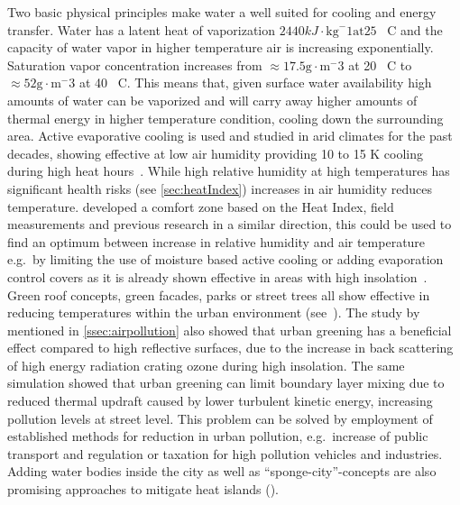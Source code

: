 \documentclass[12pt,a4paper, english,twoside]{scrartcl}
\begin{document}
      Two basic physical principles make water a well suited for cooling and energy transfer.
      Water has a latent heat of vaporization $2440 kJ\cdot \text{kg}^-1 \text{at} 25$ \textdegree\ C and the capacity of water vapor in higher temperature air is increasing exponentially.
      Saturation vapor concentration increases from $\approx17.5 \text{g}\cdot \text{m}^-3$ at 20 \textdegree\ C  to $\approx 52 \text{g}\cdot \text{m}^-3$ at 40 \textdegree\ C.
      This means that, given surface water availability high amounts of water can be vaporized and will carry away higher amounts of thermal energy in higher temperature condition, cooling down the surrounding area. 
      Active evaporative cooling is used and studied in arid climates for the past decades, showing effective at low air humidity providing 10 to 15 K cooling during high heat hours~\autocite{Vanos2022}.
      While high relative humidity at high temperatures has significant health risks (see \cref{sec:heatIndex}) increases in air humidity reduces temperature.
      \Cite{Pontes2022} developed a comfort zone based on the Heat Index, field measurements and previous research in a similar direction, this could be used to find an optimum between increase in relative humidity and air temperature e.g.\ by limiting the use of moisture based active cooling or adding evaporation control covers as it is already shown effective in areas with high insolation~\cite{Ghazvinian2021}.\\
      Green roof concepts, green facades, parks or street trees all show effective in reducing temperatures within the urban environment (see~\cite{Ramamurthy2014, Feyisa2014, Dimoudi2003, Gartland2008}).
      The study by~\cite{Fallmann2016} mentioned in \cref{ssec:airpollution} also showed that urban greening has a beneficial effect compared to high reflective surfaces, due to the increase in back scattering of high energy radiation crating ozone during high insolation.
      The same simulation showed that urban greening can limit boundary layer mixing due to reduced thermal updraft caused by lower turbulent kinetic energy, increasing pollution levels at street level.
      This problem can be solved by employment of established methods for reduction in urban pollution, e.g.\ increase of public transport and regulation or taxation for high pollution vehicles and industries. 
      Adding water bodies inside the city as well as ``sponge-city''-concepts are also promising approaches to mitigate heat islands (\cite{He2019}).
\end{document}
